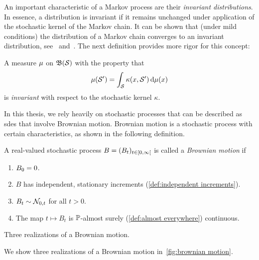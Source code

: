 An important characteristic of a Markov process are their \emph{invariant distributions}.
In essence, a distribution is invariant if it remains unchanged under application of the stochastic kernel of the Markov chain.
It can be shown that (under mild conditions) the distribution of a Markov chain converges to an invariant distribution, see~\cite[chapter 18]{Klenke2014} and~\cite[Theorem 6.1]{meyn_stability_1993}.
The next definition provides more rigor for this concept:
\begin{definition}%
	\label{def:invariant distribution}
	A measure \( \mu \) on \( \mathfrak{B}(\mathcal{S}) \) with the property that
	\begin{equation}
		\mu(\mathcal{S}^\prime) = \int_{\mathcal{S}} \kappa(x, \mathcal{S}^\prime)\,\mathrm{d}\mu(x)
	\end{equation}
	is \emph{invariant} with respect to the stochastic kernel \( \kappa \).
\end{definition}

In this thesis, we rely heavily on stochastic processes that can be described as \glspl{sde} that involve Brownian motion.
Brownian motion is a stochastic process with certain characteristics, as shown in the following definition.
\begin{definition}%
	\label{def:brownian motion}
	A real-valued stochastic process \( B = (\Brownian_t)_{t \in \rinterval{0}{\infty}} \) is called a \emph{Brownian motion} if
	\begin{enumerate}
		\item \( B_{\num{0}} = \num{0} \).
		\item \( B \) has independent, stationary increments (\cref{def:independent increments}).
		\item \( B_t \sim \mathcal{N}_{\num{0}, t} \) for all \( t > \num{0} \).
		\item The map \( t \mapsto B_t \) is \( \mathbb{P} \)-almost surely (\cref{def:almost everywhere}) continuous.
	\end{enumerate}
\end{definition}
\begin{sidefigure}
	\centering
	\caption[Three realizations of a Brownian motion]{Three realizations of a Brownian motion.}%
	\label{fig:brownian motion}
\end{sidefigure}
We show three realizations of a Brownian motion in~\cref{fig:brownian motion}.

